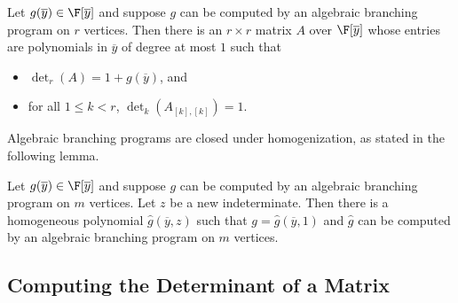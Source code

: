 \documentclass[letterpaper, 11pt]{amsart}
\begin{document}
\begin{lem}\label{lem:ABP_to_det}
  Let $g(\overline{y}) \in \F[\overline{y}]$ and suppose $g$ can be computed by an algebraic branching program on $r$ vertices.
  Then there is an $r \times r$ matrix $A$ over $\F[\overline{y}]$ whose entries are polynomials in $\overline{y}$ of degree at most $1$ such that
  \begin{itemize}
    \item $\det_r(A) = 1 + g(\overline{y})$, and
    \item for all $1 \leq k < r$, $\det_k(A_{[k], [k]}) = 1$.
  \end{itemize}
\end{lem}

Algebraic branching programs are closed under homogenization, as stated in the following lemma.

\begin{lem}[{\cite[Lemma 3.7]{AF21}}]\label{lem:homog_ABP}
  Let $g(\overline{y}) \in \F[\overline{y}]$ and suppose $g$ can be computed by an algebraic branching program on $m$ vertices.
  Let $z$ be a new indeterminate.
  Then there is a homogeneous polynomial $\widehat{g}(\overline{y}, z)$ such that $g = \widehat{g}(\overline{y}, 1)$ and $\widehat{g}$ can be computed by an algebraic branching program on $m$ vertices.
\end{lem}

\subsection{Computing the Determinant of a Matrix} 
\end{document}
